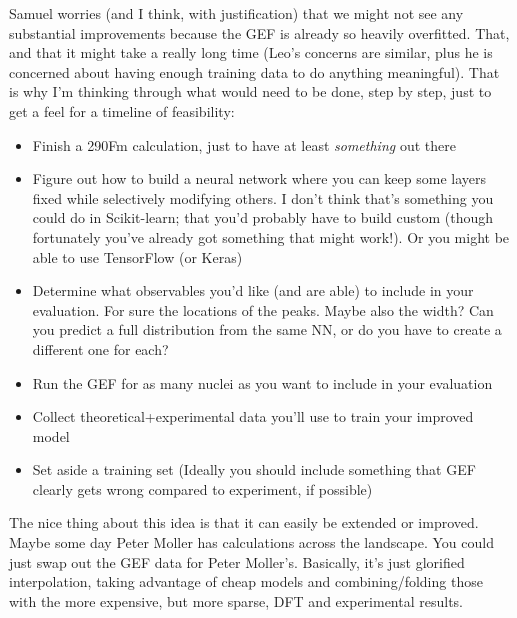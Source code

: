 Samuel worries (and I think, with justification) that we might not see any substantial improvements because the GEF is already so heavily overfitted. That, and that it might take a really long time (Leo's concerns are similar, plus he is concerned about having enough training data to do anything meaningful). That is why I'm thinking through what would need to be done, step by step, just to get a feel for a timeline of feasibility:
\begin{itemize}
	\item Finish a 290Fm calculation, just to have at least \textit{something} out there
	\item Figure out how to build a neural network where you can keep some layers fixed while selectively modifying others. I don't think that's something you could do in Scikit-learn; that you'd probably have to build custom (though fortunately you've already got something that might work!). Or you might be able to use TensorFlow (or Keras)
	\item Determine what observables you'd like (and are able) to include in your evaluation. For sure the locations of the peaks. Maybe also the width? Can you predict a full distribution from the same NN, or do you have to create a different one for each?
	\item Run the GEF for as many nuclei as you want to include in your evaluation
	\item Collect theoretical+experimental data you'll use to train your improved model
	\item Set aside a training set (Ideally you should include something that GEF clearly gets wrong compared to experiment, if possible)
\end{itemize}

The nice thing about this idea is that it can easily be extended or improved. Maybe some day Peter Moller has calculations across the landscape. You could just swap out the GEF data for Peter Moller's. Basically, it's just glorified interpolation, taking advantage of cheap models and combining/folding those with the more expensive, but more sparse, DFT and experimental results.